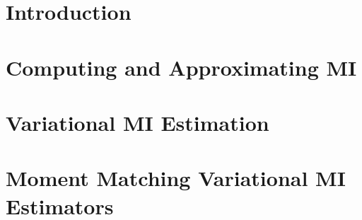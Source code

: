 \documentclass{article}
\begin{document}

\section{Introduction}\label{Intro}


\section{Computing and Approximating MI}\label{background}


\section{Variational MI Estimation}\label{varapprox}


\section{Moment Matching Variational MI Estimators}\label{varoptim}

\end{document}
